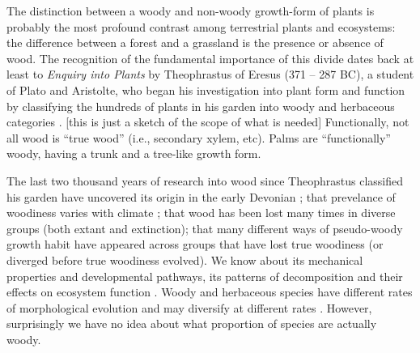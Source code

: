 \documentclass[12pt]{article}
\begin{document}
%
The distinction between a woody and non-woody growth-form of plants is
probably the most profound contrast among terrestrial plants and
ecosystems: the difference between a forest and a grassland is the
presence or absence of wood. The recognition of the fundamental
importance of this divide dates back at least to \textit{Enquiry into
  Plants} by Theophrastus of Eresus (371 -- 287 BC), a student of
Plato and Aristolte, who began his investigation into plant form and
function by classifying the hundreds of plants in his garden into
woody and herbaceous categories \citep{theophrastus1916enquiry}.
% 
[this is just a sketch of the scope of what is needed] Functionally,
not all wood is ``true wood'' (i.e., secondary xylem, etc).  Palms are
``functionally'' woody, having a trunk and a tree-like growth form.

The last two thousand years of research into wood since Theophrastus
classified his garden have uncovered its origin in the early Devonian
\citep[$\sim$~400 mya;][]{gerrienne2011simple}; that prevelance of
woodiness varies with climate \citep{judd1994}; that wood has been
lost many times in diverse groups (both extant and extinction); that
many different ways of pseudo-woody growth habit have appeared across
groups that have lost true woodiness (or diverged before true
woodiness evolved).  We know about its mechanical properties and
developmental pathways, its patterns of decomposition and their
effects on ecosystem function \citep{Cornwellwood}.  Woody and
herbaceous species have different rates of morphological evolution and
may diversify at different rates \citep{SmithDonoghue}.
%
However, surprisingly we have no idea about what proportion of species
are actually woody.

% 
\end{document}
